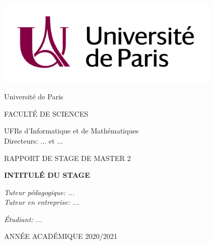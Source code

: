 \documentclass[12pt]{article}
\begin{document}
\renewcommand{\labelitemi}{$\circ$}

\begin{titlepage}
    \begin{center}
        \includegraphics[width=0.8\textwidth]{resources/img/logo_uni.jpg}
   

        \Large Université de Paris \normalsize

        \vspace{1cm}
        \large FACULTÉ DE SCIENCES \normalsize
        
        \vspace{0.2cm}
        \renewcommand{\baselinestretch}{1.3}
        \large
        UFRs d'Informatique et de Mathématiques\\
        Directeurs: ... et ...
        \normalsize
        \renewcommand{\baselinestretch}{1.0}
        
        \vspace{2cm}
        \large RAPPORT DE STAGE DE MASTER 2 \normalsize
        
        \vspace{1.5cm}
        \renewcommand{\baselinestretch}{1.8}
        \Large 
        \textbf{INTITULÉ DU STAGE}
        \normalsize
        \renewcommand{\baselinestretch}{1.0}
    \end{center}
    
    \vfill
    \begin{flushleft}
    \renewcommand{\baselinestretch}{1.3}
    \large
    \textit{Tuteur pédagogique: ...\\
    Tuteur en entreprise: ...}
    \normalsize
    \renewcommand{\baselinestretch}{1.0}
    \end{flushleft}
    \vspace{1cm}
    
    \begin{flushright}
        \large
        \textit{Étudiant: ...}
        \normalsize
    \end{flushright}
    
    \vspace{1cm}
    
    \begin{center}
        \large ANNÉE ACADÉMIQUE 2020/2021 \normalsize
    \end{center}

\end{titlepage}
\restoregeometry
\end{document}
